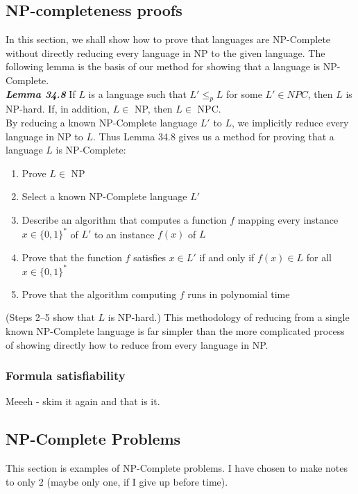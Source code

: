 \subsection{NP-completeness proofs}
In this section, we shall show how to prove that languages are NP-Complete without directly reducing every language in NP to the given language. The following lemma is the basis of our method for showing that a language is NP-Complete. \\

\textbf{\textit{Lemma 34.8}} If $L$ is a language such that $L' \leq_p L$ for some $L' \in NPC$, then $L$ is NP-hard. If, in addition, $L \in$ NP, then $L \in$ NPC.\\

By reducing a known NP-Complete language $L'$ to $L$, we implicitly reduce every language in NP to $L$. Thus Lemma 34.8 gives us a method for proving that a language $L$ is NP-Complete: 

\begin{enumerate}
	\item Prove $L \in$ NP
	\item Select a known NP-Complete language $L'$
	\item Describe an algorithm that computes a function $f$ mapping every instance $x \in \{0, 1\}^*$ of $L'$ to an instance $f(x)$ of $L$
	\item Prove that the function $f$ satisfies $x \in L'$ if and only if $f(x) \in L$ for all $x \in \{0, 1\}^*$
	\item Prove that the algorithm computing $f$ runs in polynomial time
\end{enumerate}

(Steps 2–5 show that $L$ is NP-hard.) This methodology of reducing from a single known NP-Complete language is far simpler than the more complicated process of showing directly how to reduce from every language in NP.

\subsubsection{Formula satisfiability}
Meeeh - skim it again and that is it.

\subsection{NP-Complete Problems}
This section is examples of NP-Complete problems. I have chosen to make notes to only 2 (maybe only one, if I give up before time).

